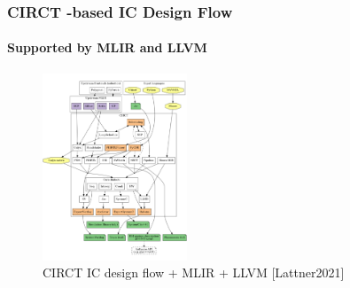 \documentclass[xcolor={usenames,dvipsnames},hyperref={hyperindex,bookmarks}]{beamer}
\begin{document}
\begin{frame}
	\frametitle{CIRCT -based IC Design Flow}
	\framesubtitle{Supported by MLIR and LLVM}
	
	\begin{figure}
		\centering
		\includegraphics[height=2.2in]{./pics/CIRCTMLIR}
		\caption{CIRCT IC design flow + MLIR + LLVM [Lattner2021]}
	\end{figure}
\end{frame}









%

\end{document}
